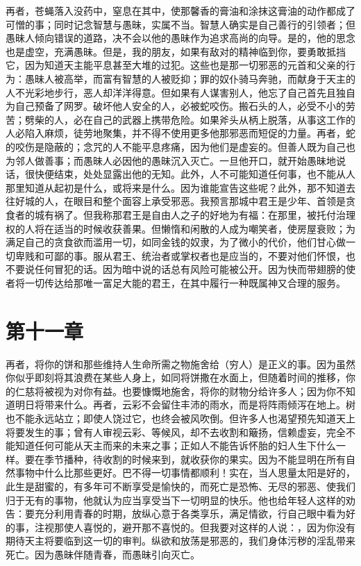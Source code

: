 再者，苍蝇落入没药中，窒息在其中，使那馨香的膏油和涂抹这膏油的动作都成了可憎的事；同时记念智慧与愚昧，实属不当。智慧人确实是自己善行的引领者；但愚昧人倾向错误的道路，决不会以他的愚昧作为追求高尚的向导。是的，他的思念也是虚空，充满愚昧。但是，我的朋友，如果有敌对的精神临到你，要勇敢抵挡它，因为知道天主能平息甚至大堆的过犯。这些也是那一切邪恶的元首和父亲的行为：愚昧人被高举，而富有智慧的人被贬抑；罪的奴仆骑马奔驰，而献身于天主的人不光彩地步行，恶人却洋洋得意。但如果有人谋害别人，他忘了自己首先且独自为自己预备了网罗。破坏他人安全的人，必被蛇咬伤。搬石头的人，必受不小的劳苦；劈柴的人，必在自己的武器上携带危险。如果斧头从柄上脱落，从事这工作的人必陷入麻烦，徒劳地聚集，并不得不使用更多他那邪恶而短促的力量。再者，蛇的咬伤是隐蔽的；念咒的人不能平息疼痛，因为他们是虚妄的。但善人既为自己也为邻人做善事；而愚昧人必因他的愚昧沉入灭亡。一旦他开口，就开始愚昧地说话，很快便结束，处处显露出他的无知。此外，人不可能知道任何事，也不能从人那里知道从起初是什么，或将来是什么。因为谁能宣告这些呢？此外，那不知道去往好城的人，在眼目和整个面容上承受邪恶。我预言那城中君王是少年、首领是贪食者的城有祸了。但我称那君王是自由人之子的好地为有福：在那里，被托付治理权的人将在适当的时候收获善果。但懒惰和闲散的人成为嘲笑者，使房屋衰败；为满足自己的贪食欲而滥用一切，如同金钱的奴隶，为了微小的代价，他们甘心做一切卑贱和可鄙的事。服从君王、统治者或掌权者也是应当的，不要对他们怀恨，也不要说任何冒犯的话。因为暗中说的话总有风险可能被公开。因为快而带翅膀的使者将一切传达给那唯一富足大能的君王，在其中履行一种既属神又合理的服务。\par


\section{第十一章}

再者，将你的饼和那些维持人生命所需之物施舍给（穷人）是正义的事。因为虽然你似乎即刻将其浪费在某些人身上，如同将饼撒在水面上，但随着时间的推移，你的仁慈将被视为对你有益。也要慷慨地施舍，将你的财物分给许多人；因为你不知道明日将带来什么。再者，云彩不会留住丰沛的雨水，而是将阵雨倾泻在地上。树也不能永远站立；即使人饶过它，也终会被风吹倒。但许多人也渴望预先知道天上将要发生的事；曾有人审视云彩、等候风，却不去收割和簸扬，信赖虚妄，完全不能知道任何可能从天主而来的未来之事；正如人不能告诉怀胎的妇人生下什么一样。要在季节播种，待收割的时候来到，就收获你的果实。因为不能显明在所有自然事物中什么比那些更好。巴不得一切事情都顺利！实在，当人思量太阳是好的，此生是甜蜜的，有多年可不断享受是愉快的，而死亡是恐怖、无尽的邪恶、使我们归于无有的事物，他就认为应当享受当下一切明显的快乐。他也给年轻人这样的劝告：要充分利用青春的时期，放纵心意于各类享乐，满足情欲，行自己眼中看为好的事，注视那使人喜悦的，避开那不喜悦的。但我要对这样的人说：，因为你没有期待天主将要临到这一切的审判。纵欲和放荡是邪恶的，我们身体污秽的淫乱带来死亡。因为愚昧伴随青春，而愚昧引向灭亡。\par

